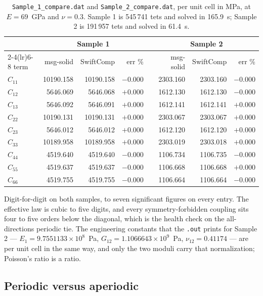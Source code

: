 \begin{table}[htbp]
\centering
\small
\begin{tabular}{lrrrcrrr}
\toprule
& \multicolumn{3}{c}{Sample 1} & & \multicolumn{3}{c}{Sample 2} \\
\cmidrule(lr){2-4}\cmidrule(lr){6-8}
term & msg-solid & SwiftComp & err \% & & msg-solid & SwiftComp & err \% \\
\midrule
$C_{11}$ & 10190.158 & 10190.158 & $-0.000$ & & 2303.160 & 2303.160 & $-0.000$ \\
$C_{12}$ & 5646.069 & 5646.068 & $+0.000$ & & 1612.130 & 1612.130 & $-0.000$ \\
$C_{13}$ & 5646.092 & 5646.091 & $+0.000$ & & 1612.141 & 1612.141 & $+0.000$ \\
$C_{22}$ & 10190.131 & 10190.131 & $+0.000$ & & 2303.067 & 2303.067 & $+0.000$ \\
$C_{23}$ & 5646.012 & 5646.012 & $+0.000$ & & 1612.120 & 1612.120 & $+0.000$ \\
$C_{33}$ & 10189.958 & 10189.958 & $+0.000$ & & 2303.019 & 2303.018 & $+0.000$ \\
$C_{44}$ & 4519.640 & 4519.640 & $-0.000$ & & 1106.734 & 1106.735 & $-0.000$ \\
$C_{55}$ & 4519.637 & 4519.637 & $-0.000$ & & 1106.668 & 1106.668 & $+0.000$ \\
$C_{66}$ & 4519.755 & 4519.755 & $-0.000$ & & 1106.664 & 1106.664 & $-0.000$ \\
\bottomrule
\end{tabular}
\caption{\texttt{Sample\_1\_compare.dat} and \texttt{Sample\_2\_compare.dat},
per unit cell in MPa, at $E = 69$~GPa and $\nu = 0.3$. Sample 1 is 545\,741
tets and solved in 165.9~s; Sample 2 is 191\,957 tets and solved in 61.4~s.}
\label{tab:solid-tpmsparity}
\end{table}

Digit-for-digit on both samples, to seven significant figures on every entry.
The effective law is cubic to five digits, and every symmetry-forbidden coupling
sits four to five orders below the diagonal, which is the health check on the
all-directions periodic tie. The engineering constants that the \texttt{.out}
prints for Sample 2 --- $E_1 = 9.7551133\times10^{8}$~Pa,
$G_{12} = 1.1066643\times10^{9}$~Pa, $\nu_{12} = 0.41174$ --- are per unit
cell in the same way, and only the two moduli carry that normalization;
Poisson's ratio is a ratio.

\subsection{Periodic versus aperiodic}

